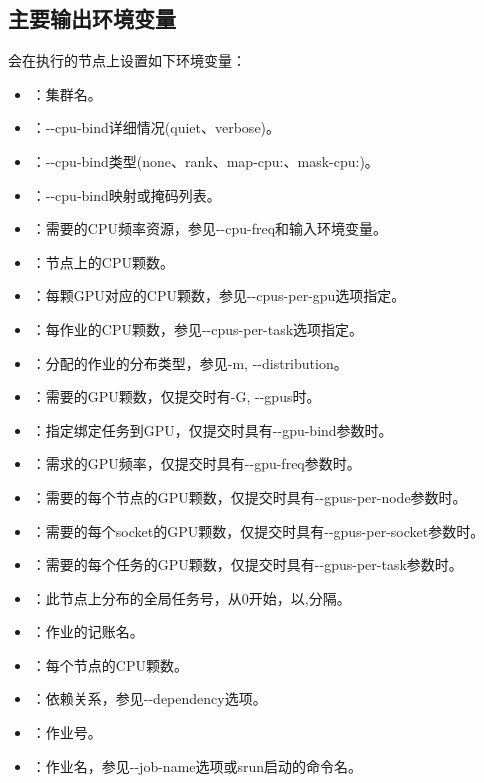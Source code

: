 \subsection{主要输出环境变量}
会在执行的节点上设置如下环境变量：
\begin{itemize}
	\item {}：集群名。
	\item {}：-{}-cpu-bind详细情况(quiet、verbose)。
	\item {}：-{}-cpu-bind类型(none、rank、map-cpu:、mask-cpu:)。
	\item {}：-{}-cpu-bind映射或掩码列表。
	\item {}：需要的CPU频率资源，参见-{}-cpu-freq和输入环境变量。
	\item {}：节点上的CPU颗数。
	\item {}：每颗GPU对应的CPU颗数，参见-{}-cpus-per-gpu选项指定。
	\item {}：每作业的CPU颗数，参见-{}-cpus-per-task选项指定。
	\item {}：分配的作业的分布类型，参见-m, -{}-distribution。
	\item {}：需要的GPU颗数，仅提交时有-G, -{}-gpus时。
	\item {}：指定绑定任务到GPU，仅提交时具有-{}-gpu-bind参数时。
	\item {}：需求的GPU频率，仅提交时具有-{}-gpu-freq参数时。
	\item {}：需要的每个节点的GPU颗数，仅提交时具有-{}-gpus-per-node参数时。
	\item {}：需要的每个socket的GPU颗数，仅提交时具有-{}-gpus-per-socket参数时。
	\item {}：需要的每个任务的GPU颗数，仅提交时具有-{}-gpus-per-task参数时。
	\item {}：此节点上分布的全局任务号，从0开始，以,分隔。
	\item {}：作业的记账名。
	\item {}：每个节点的CPU颗数。
	\item {}：依赖关系，参见-{}-dependency选项。
	\item {}：作业号。
	\item {}：作业名，参见-{}-job-name选项或srun启动的命令名。

\end{itemize}
